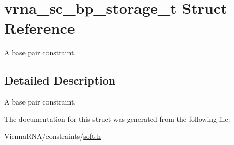 \hypertarget{structvrna__sc__bp__storage__t}{}\section{vrna\+\_\+sc\+\_\+bp\+\_\+storage\+\_\+t Struct Reference}
\label{structvrna__sc__bp__storage__t}


A base pair constraint.  




\subsection{Detailed Description}
A base pair constraint. 

The documentation for this struct was generated from the following file\+:\begin{DoxyCompactItemize}
\item 
Vienna\+R\+N\+A/constraints/\hyperlink{soft_8h}{soft.\+h}\end{DoxyCompactItemize}
